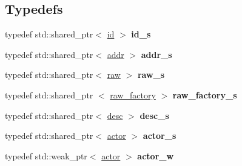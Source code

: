 \subsection*{\-Typedefs}
\begin{DoxyCompactItemize}
\item 
\hypertarget{namespaceglutpp_1_1actor_aa46fc2a6ef847c15d7fae0c2f9a94d1b}{typedef std\-::shared\-\_\-ptr$<$ \hyperlink{classglutpp_1_1actor_1_1id}{id} $>$ {\bfseries id\-\_\-s}}\label{namespaceglutpp_1_1actor_aa46fc2a6ef847c15d7fae0c2f9a94d1b}

\item 
\hypertarget{namespaceglutpp_1_1actor_a7b9c3a39b23ce1044b5be01bedaf26df}{typedef std\-::shared\-\_\-ptr$<$ \hyperlink{classglutpp_1_1actor_1_1addr}{addr} $>$ {\bfseries addr\-\_\-s}}\label{namespaceglutpp_1_1actor_a7b9c3a39b23ce1044b5be01bedaf26df}

\item 
\hypertarget{namespaceglutpp_1_1actor_aa11f519cc77235fd0ecfcf39022ebcc9}{typedef std\-::shared\-\_\-ptr$<$ \hyperlink{classglutpp_1_1actor_1_1raw}{raw} $>$ {\bfseries raw\-\_\-s}}\label{namespaceglutpp_1_1actor_aa11f519cc77235fd0ecfcf39022ebcc9}

\item 
\hypertarget{namespaceglutpp_1_1actor_af46bb97ed13431575392db64c3aac1dc}{typedef std\-::shared\-\_\-ptr\*
$<$ \hyperlink{classglutpp_1_1actor_1_1raw__factory}{raw\-\_\-factory} $>$ {\bfseries raw\-\_\-factory\-\_\-s}}\label{namespaceglutpp_1_1actor_af46bb97ed13431575392db64c3aac1dc}

\item 
\hypertarget{namespaceglutpp_1_1actor_a47f84b27f53e76a80a72d5c587f8f1f9}{typedef std\-::shared\-\_\-ptr$<$ \hyperlink{classglutpp_1_1actor_1_1desc}{desc} $>$ {\bfseries desc\-\_\-s}}\label{namespaceglutpp_1_1actor_a47f84b27f53e76a80a72d5c587f8f1f9}

\item 
\hypertarget{namespaceglutpp_1_1actor_aad09afbb983342b4e44dc5facbeeeabb}{typedef std\-::shared\-\_\-ptr$<$ \hyperlink{classglutpp_1_1actor_1_1actor}{actor} $>$ {\bfseries actor\-\_\-s}}\label{namespaceglutpp_1_1actor_aad09afbb983342b4e44dc5facbeeeabb}

\item 
\hypertarget{namespaceglutpp_1_1actor_af6ec3ac715b98cfc8d1629d4acbf92ae}{typedef std\-::weak\-\_\-ptr$<$ \hyperlink{classglutpp_1_1actor_1_1actor}{actor} $>$ {\bfseries actor\-\_\-w}}\label{namespaceglutpp_1_1actor_af6ec3ac715b98cfc8d1629d4acbf92ae}


\end{DoxyCompactItemize}
